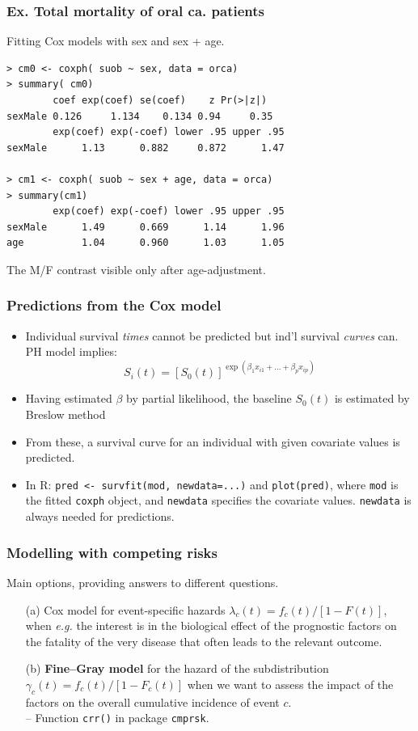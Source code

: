 \documentclass[handout,12pt,dvipsnames,t]{beamer}
\begin{document}
\begin{frame}[fragile]
\frametitle{Ex. Total mortality of oral ca. patients}

Fitting Cox models with sex and sex + age.
\small
\begin{verbatim}
> cm0 <- coxph( suob ~ sex, data = orca)
> summary( cm0)
        coef exp(coef) se(coef)    z Pr(>|z|)
sexMale 0.126     1.134    0.134 0.94     0.35
        exp(coef) exp(-coef) lower .95 upper .95
sexMale      1.13      0.882     0.872      1.47

> cm1 <- coxph( suob ~ sex + age, data = orca)
> summary(cm1)
        exp(coef) exp(-coef) lower .95 upper .95
sexMale      1.49      0.669      1.14      1.96
age          1.04      0.960      1.03      1.05
\end{verbatim}
\normalsize
The M/F contrast visible only after age-adjustment.
\end{frame}

\begin{frame}[fragile]
\frametitle{Predictions from the Cox model}
\begin{itemize}
\item
Individual survival \textit{times} cannot be predicted
but ind'l survival \emph{curves} can.
PH model implies:
\[
S_i(t) = [S_0(t) ]^{\exp(\beta_1 x_{i1} +\ldots+\beta_p x_{ip})}
\]
\item
Having  estimated $\beta$ by partial likelihood, 
the baseline $S_0(t)$ is estimated by Breslow method 
\item 
\medskip
 From these, a survival curve for an individual
with given covariate values is predicted.
\item
\medskip
In R: 
\texttt{pred <- survfit(mod, newdata=...)} 
and \texttt{plot(pred)}, where \texttt{mod} is the fitted
\texttt{coxph} object, 
and \texttt{newdata}  
specifies the covariate values. \texttt{newdata} is always needed for
predictions.
\end{itemize}
\end{frame}

\begin{frame}[fragile]
\frametitle{Modelling with competing risks}

Main options, providing answers to different questions.

\begin{itemize}
\item[(a)]
  Cox model for event-specific hazards $\lambda_c(t) = f_c(t)/[1-F(t)]$, when \textit{e.g.} the interest is in the biological effect of the prognostic factors on the fatality of the very disease that often leads to the relevant outcome.  
  \bigskip 
\item[(b)]
 \textbf{Fine--Gray model} for the hazard  of the subdistribution $\gamma_c(t) = f_c(t)/[1-F_c(t)]$ 
  when we want to assess the impact of the factors on the overall cumulative incidence of event $c$.  \\
  -- Function \texttt{crr()} in package \texttt{cmprsk}. 
\end{itemize}

\end{frame}
\end{document}
